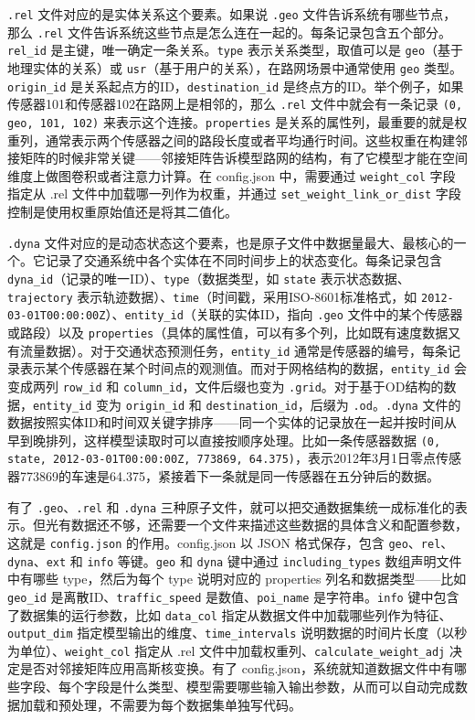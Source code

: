 \texttt{.rel} 文件对应的是实体关系这个要素。如果说 \texttt{.geo} 文件告诉系统有哪些节点，那么 \texttt{.rel} 文件告诉系统这些节点是怎么连在一起的。每条记录包含五个部分。\texttt{rel\_id} 是主键，唯一确定一条关系。\texttt{type} 表示关系类型，取值可以是 \texttt{geo}（基于地理实体的关系）或 \texttt{usr}（基于用户的关系），在路网场景中通常使用 \texttt{geo} 类型。\texttt{origin\_id} 是关系起点方的ID，\texttt{destination\_id} 是终点方的ID。举个例子，如果传感器101和传感器102在路网上是相邻的，那么 \texttt{.rel} 文件中就会有一条记录 \texttt{(0, geo, 101, 102)} 来表示这个连接。\texttt{properties} 是关系的属性列，最重要的就是权重列，通常表示两个传感器之间的路段长度或者平均通行时间。这些权重在构建邻接矩阵的时候非常关键——邻接矩阵告诉模型路网的结构，有了它模型才能在空间维度上做图卷积或者注意力计算。在 config.json 中，需要通过 \texttt{weight\_col} 字段指定从 .rel 文件中加载哪一列作为权重，并通过 \texttt{set\_weight\_link\_or\_dist} 字段控制是使用权重原始值还是将其二值化。

\texttt{.dyna} 文件对应的是动态状态这个要素，也是原子文件中数据量最大、最核心的一个。它记录了交通系统中各个实体在不同时间步上的状态变化。每条记录包含 \texttt{dyna\_id}（记录的唯一ID）、\texttt{type}（数据类型，如 \texttt{state} 表示状态数据、\texttt{trajectory} 表示轨迹数据）、\texttt{time}（时间戳，采用ISO-8601标准格式，如 \texttt{2012-03-01T00:00:00Z}）、\texttt{entity\_id}（关联的实体ID，指向 \texttt{.geo} 文件中的某个传感器或路段）以及 \texttt{properties}（具体的属性值，可以有多个列，比如既有速度数据又有流量数据）。对于交通状态预测任务，\texttt{entity\_id} 通常是传感器的编号，每条记录表示某个传感器在某个时间点的观测值。而对于网格结构的数据，\texttt{entity\_id} 会变成两列 \texttt{row\_id} 和 \texttt{column\_id}，文件后缀也变为 \texttt{.grid}。对于基于OD结构的数据，\texttt{entity\_id} 变为 \texttt{origin\_id} 和 \texttt{destination\_id}，后缀为 \texttt{.od}。\texttt{.dyna} 文件的数据按照实体ID和时间双关键字排序——同一个实体的记录放在一起并按时间从早到晚排列，这样模型读取时可以直接按顺序处理。比如一条传感器数据 \texttt{(0, state, 2012-03-01T00:00:00Z, 773869, 64.375)}，表示2012年3月1日零点传感器773869的车速是64.375，紧接着下一条就是同一传感器在五分钟后的数据。

有了 \texttt{.geo}、\texttt{.rel} 和 \texttt{.dyna} 三种原子文件，就可以把交通数据集统一成标准化的表示。但光有数据还不够，还需要一个文件来描述这些数据的具体含义和配置参数，这就是 \texttt{config.json} 的作用。config.json 以 JSON 格式保存，包含 \texttt{geo}、\texttt{rel}、\texttt{dyna}、\texttt{ext} 和 \texttt{info} 等键。\texttt{geo} 和 \texttt{dyna} 键中通过 \texttt{including\_types} 数组声明文件中有哪些 type，然后为每个 type 说明对应的 properties 列名和数据类型——比如 \texttt{geo\_id} 是离散ID、\texttt{traffic\_speed} 是数值、\texttt{poi\_name} 是字符串。\texttt{info} 键中包含了数据集的运行参数，比如 \texttt{data\_col} 指定从数据文件中加载哪些列作为特征、\texttt{output\_dim} 指定模型输出的维度、\texttt{time\_intervals} 说明数据的时间片长度（以秒为单位）、\texttt{weight\_col} 指定从 .rel 文件中加载权重列、\texttt{calculate\_weight\_adj} 决定是否对邻接矩阵应用高斯核变换。有了 config.json，系统就知道数据文件中有哪些字段、每个字段是什么类型、模型需要哪些输入输出参数，从而可以自动完成数据加载和预处理，不需要为每个数据集单独写代码。

